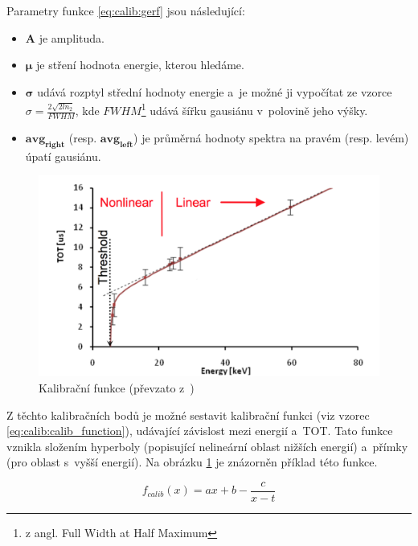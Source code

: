 Parametry funkce \ref{eq:calib:gerf} jsou následující:
\begin{itemize}
	\item $\mathbf{A}$ je amplituda.
	\item $\mathbf{\mu}$ je stření hodnota energie, kterou hledáme.
	\item $\mathbf{\sigma}$ udává rozptyl střední hodnoty energie a~je možné ji vypočítat ze vzorce 
		$\sigma = \frac{2\sqrt{2ln_2}}{FWHM}$, kde $FWHM$\footnote{z angl. Full Width at Half Maximum} udává šířku gausiánu v~polovině jeho výšky.
	\item $\mathbf{avg_{right}}$ (resp. $\mathbf{avg_{left}}$) je průměrná hodnoty spektra na pravém (resp. levém) úpatí gausiánu.
\end{itemize}
 
\begin{figure}[th]
	\begin{center}
		\includegraphics[width=13cm]{figures/calib_function.png}
		\caption{Kalibrační funkce (převzato z~\cite{Jakubek2011S262})}
		\label{fig:calib:calib_function}
	\end{center}
\end{figure}

Z těchto kalibračních bodů je možné sestavit kalibrační funkci (viz vzorec \ref{eq:calib:calib_function}), udávající závislost mezi energií a~TOT. Tato funkce vznikla složením hyperboly (popisující nelineární oblast nižších energií) a~přímky (pro oblast s~vyšší energií). Na obrázku \ref{fig:calib:calib_function} je znázorněn příklad této funkce.

\begin{equation}\label{eq:calib:calib_function}
	f_{calib}(x) = ax + b - \frac{c}{x-t}
\end{equation}


